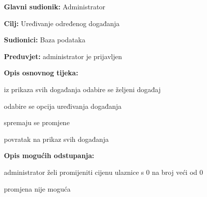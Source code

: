 					\noindent {}
					\begin{packed_item}
	
						\item \textbf{Glavni sudionik: }Administrator
						\item  \textbf{Cilj:} Uređivanje određenog događanja
						\item  \textbf{Sudionici:} Baza podataka
						\item  \textbf{Preduvjet:} administrator je prijavljen
						\item  \textbf{Opis osnovnog tijeka:}
						
						\item[] \begin{packed_enum}
	
							\item iz prikaza svih događanja odabire se željeni događaj
							\item odabire se opcija uređivanja događanja
							\item spremaju se promjene
							\item povratak na prikaz svih događanja
						\end{packed_enum}
						\item  \textbf{Opis mogućih odstupanja:}
						
						\item[] \begin{packed_item}
	
							\item[3.a] administrator želi promijeniti cijenu ulaznice s 0 na broj veći od 0
							\item[] \begin{packed_enum}
								
								\item promjena nije moguća
								
							\end{packed_enum}
						
							
						\end{packed_item}
							
					\end{packed_item}
					
